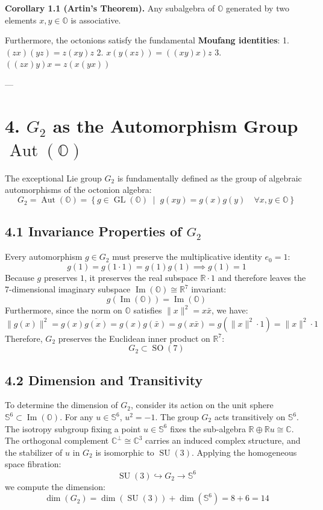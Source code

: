 \documentclass[11pt,twoside,openright]{amsbook}
\begin{document}
\textbf{Corollary 1.1 (Artin's Theorem).} Any subalgebra of $\mathbb{O}$ generated by two elements $x, y \in \mathbb{O}$ is associative.

Furthermore, the octonions satisfy the fundamental \textbf{Moufang identities}:
1. $(z x)(y z) = z(x y) z$
2. $x(y(x z)) = ((x y) x) z$
3. $((z x) y) x = z(x(y x))$

---

\section{4. $G_2$ as the Automorphism Group $\operatorname{Aut}(\mathbb{O})$}

The exceptional Lie group $G_2$ is fundamentally defined as the group of algebraic automorphisms of the octonion algebra:
$$G_2 = \operatorname{Aut}(\mathbb{O}) = \left\{ g \in \operatorname{GL}(\mathbb{O}) \;\middle|\; g(xy) = g(x)g(y) \quad \forall x, y \in \mathbb{O} \right\}$$

\subsection{4.1 Invariance Properties of $G_2$}

Every automorphism $g \in G_2$ must preserve the multiplicative identity $e_0 = 1$:
$$g(1) = g(1 \cdot 1) = g(1)g(1) \implies g(1) = 1$$
Because $g$ preserves $1$, it preserves the real subspace $\mathbb{R} \cdot 1$ and therefore leaves the 7-dimensional imaginary subspace $\operatorname{Im}(\mathbb{O}) \cong \mathbb{R}^7$ invariant:
$$g(\operatorname{Im}(\mathbb{O})) = \operatorname{Im}(\mathbb{O})$$
Furthermore, since the norm on $\mathbb{O}$ satisfies $\|x\|^2 = x \bar{x}$, we have:
$$\|g(x)\|^2 = g(x)\overline{g(x)} = g(x)g(\bar{x}) = g(x\bar{x}) = g(\|x\|^2 \cdot 1) = \|x\|^2 \cdot 1$$
Therefore, $G_2$ preserves the Euclidean inner product on $\mathbb{R}^7$:
$$G_2 \subset \operatorname{SO}(7)$$

\subsection{4.2 Dimension and Transitivity}

To determine the dimension of $G_2$, consider its action on the unit sphere $\mathbb{S}^6 \subset \operatorname{Im}(\mathbb{O})$. For any $u \in \mathbb{S}^6$, $u^2 = -1$. The group $G_2$ acts transitively on $\mathbb{S}^6$. The isotropy subgroup fixing a point $u \in \mathbb{S}^6$ fixes the sub-algebra $\mathbb{R} \oplus \mathbb{R} u \cong \mathbb{C}$. The orthogonal complement $\mathbb{C}^\perp \cong \mathbb{C}^3$ carries an induced complex structure, and the stabilizer of $u$ in $G_2$ is isomorphic to $\operatorname{SU}(3)$.
Applying the homogeneous space fibration:
$$\operatorname{SU}(3) \hookrightarrow G_2 \to \mathbb{S}^6$$
we compute the dimension:
$$\dim(G_2) = \dim(\operatorname{SU}(3)) + \dim(\mathbb{S}^6) = 8 + 6 = 14$$
\end{document}
